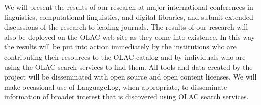 We will present the results of our research at major international
conferences in linguistics, computational linguistics, and
digital libraries, and submit extended discussions of the research to
leading journals.  The results of our research will also be deployed
on the OLAC web site as they come into existence. In this way the
results will be put into action immediately by the institutions
who are contributing their resources to the OLAC catalog and by 
individuals who are using the OLAC search services to find them.
All tools and data created by the project will be
disseminated with open source and open content licenses.
We will make occasional use of LanguageLog, when appropriate, to
disseminate information of broader interest that is discovered using
OLAC search services.
